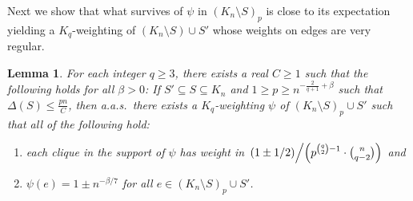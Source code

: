 \documentclass[11pt]{article}
\numberwithin{equation}{section}
\newcounter{i}
\theoremstyle{plain}
\newtheorem{lem}[thm]{Lemma}
\theoremstyle{plain} %
\theoremstyle{definition}
\newcommand{\aas}{a.a.s.\ }
\begin{document}
Next we show that what survives of $\psi$ in $(K_n\setminus S)_p$ is close to its expectation yielding a $K_q$-weighting of $(K_n\setminus S)\cup S'$ whose weights on edges are very regular. 


\begin{lem}\label{lem:YusterFractionalConcentrated}
For each integer $q\ge 3$, there exists a real $C \ge 1$ such that the following holds for all $\beta > 0$: If $S'\subseteq S\subseteq K_n$ and $1\ge p \ge n^{-\frac{2}{q+1}+\beta}$ such that $\Delta(S) \le \frac{pn}{C}$, then \aas there exists a $K_q$-weighting $\psi$ of $(K_n\setminus S)_p \cup S'$ such that all of the following hold:
\begin{enumerate}[label=(\arabic*)]
    \item\label{fractional-concentration-weight} each clique in the support of $\psi$ has weight in $\left.(1 \pm 1/2)\middle/  \left(p^{\binom{q}{2}-1}\cdot \binom{n}{q-2}\right)\right.$ and %
    \item\label{fractional-concentration-degree} $\psi(e) = 1\pm n^{-\beta/7}$ for all $e\in (K_n\setminus S)_p\cup S'$.
\end{enumerate}
\end{lem}
\end{document}
